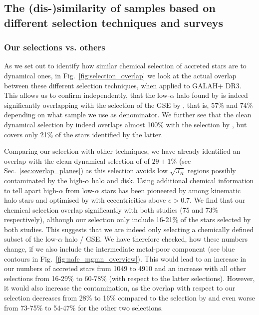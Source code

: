 \documentclass[fleqn,usenatbib]{mnras}
\begin{document}
\subsection{The (dis-)similarity of samples based on different selection techniques and surveys} \label{sec:dissimilarity}

\subsubsection{Our selections vs. others}

As we set out to identify how similar chemical selection of accreted stars are to dynamical ones, in Fig.~\ref{fig:selection_overlap} we look at the actual overlap between these different selection techniques, when applied to GALAH+ DR3. This allows us to confirm independently, that the low-$\alpha$ halo found by \citet{Nissen2010} is indeed significantly overlapping with the selection of the GSE by \citet{Naidu2020}, that is, 57\% and 74\% depending on what sample we use as denominator. We further see that the clean dynamical selection by \citet{Feuillet2021} indeed overlaps almost 100\% with the selection by \citet{Naidu2020}, but covers only 21\% of the stars identified by the latter.

Comparing our selection with other techniques, we have already identified an overlap with the clean dynamical selection of \citet{Feuillet2021} of $29\pm1\%$ (see Sec.~\ref{sec:overlap_planes}) as this selection avoids low $\sqrt{J_R}$ regions possibly contaminated by the high-$\alpha$ halo and disk. Using additional chemical information to tell apart high-$\alpha$ from low-$\alpha$ stars has been pioneered by \citet{Nissen2010} among kinematic halo stars and optimised by \citet{Naidu2020} with eccentricities above $e > 0.7$. We find that our chemical selection overlap significantly with both studies (75 and 73\% respectively), although our selection only include 16-21\% of the stars selected by both studies. This suggests that we are indeed only selecting a chemically defined subset of the low-$\alpha$ halo / GSE. We have therefore checked, how these numbers change, if we also include the intermediate metal-poor component (see blue contours in Fig.~\ref{fig:nafe_mgmn_overview}). This would lead to an increase in our numbers of accreted stars from 1049 to 4910 and an increase with all other selections from 16-29\% to 60-78\% (with respect to the latter selections). However, it would also increase the contamination, as the overlap with respect to our selection decreases from 28\% to 16\% compared to the selection by \citet{Feuillet2021} and even worse from 73-75\% to 54-47\% for the other two selections.
\end{document}

